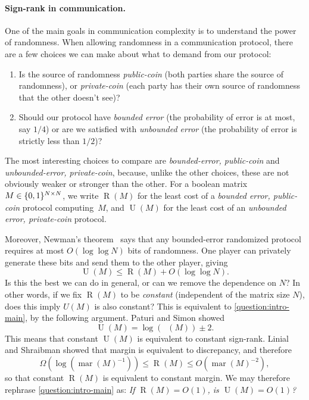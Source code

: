 \documentclass{article}
\DeclareMathOperator{\signrank}{rank_\pm}
\DeclareMathOperator{\margin}{\mathrm{mar}}
\DeclareMathOperator{\U}{U}
\DeclareMathOperator{\Rand}{R}
\begin{document}
\paragraph{Sign-rank in communication.}
One of the main goals in communication complexity is to understand the power of
randomness. When allowing randomness in a communication protocol, there are a
few choices we can make about what to demand from our protocol:
\begin{enumerate}[itemsep=0pt]
\item Is the source of randomness \emph{public-coin} (both parties share the source of randomness),
or \emph{private-coin} (each party has their own source of randomness that the other doesn't see)?
\item Should our protocol have \emph{bounded error} (the probability of error is at most, say $1/4$)
or are we satisfied with \emph{unbounded error} (the probability of error is strictly less than
$1/2$)?
\end{enumerate}
The most interesting choices to compare are \emph{bounded-error, public-coin}
and \emph{unbounded-error, private-coin}, because, unlike the other choices,
these are not obviously weaker or stronger than the other. For a boolean matrix
$M \in \{0,1\}^{N \times N}$, we write $\Rand(M)$ for the least cost of a
\emph{bounded error, public-coin} protocol computing~$M$, and $\U(M)$ for the
least cost of an \emph{unbounded error, private-coin} protocol.

Moreover, Newman's theorem~\cite{New91} says that any bounded-error randomized protocol requires at most $O(\log\log N)$ bits of randomness. One player can privately generate these bits and send them to the other player, giving
\begin{equation}
  \U(M) \leq \Rand(M) + O(\log\log N) .
\end{equation}
Is this the best we can do in general, or can we remove the dependence on $N$?
In other words, if we fix $\Rand(M)$ to be \emph{constant} (\ie independent of the
matrix size $N$), does this imply $U(M)$ is also constant? This is equivalent to
\cref{question:intro-main}, by the following argument. Paturi and Simon
\cite{PS86} showed
\begin{equation}
  \U(M) = \log(\signrank(M))\pm 2.
\end{equation}
This means that constant $\U(M)$ is equivalent to constant sign-rank. 
Linial and Shraibman \cite{LS09} showed that margin is equivalent to discrepancy, and therefore
\begin{equation}
\Omega(\log(\margin(M)^{-1})) \leq \Rand(M) \leq O(\margin(M)^{-2}) ,
\end{equation}
so that constant $\Rand(M)$ is equivalent to constant margin. We may therefore rephrase
\cref{question:intro-main} as: \emph{If $\Rand(M) = O(1)$, is $\U(M) = O(1)$?}
\end{document}
